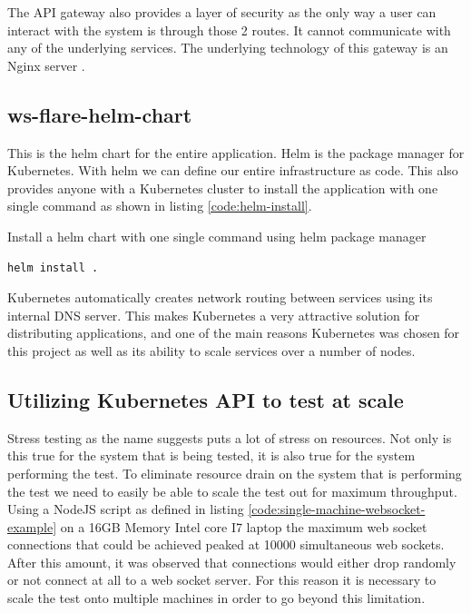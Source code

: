 The API gateway also provides a layer of security as the only way a user can interact with the system is through those 2 routes. It cannot communicate with any of the underlying services. The underlying technology of this gateway is an Nginx server \cite{nginx}.

\subsection{ws-flare-helm-chart}

This is the helm chart for the entire application. Helm is the package manager for Kubernetes. With helm we can define our entire infrastructure as code. This also provides anyone with a Kubernetes cluster to install the application with one single command as shown in listing \ref{code:helm-install}.

\begin{listing}[H]
    \caption{Install a helm chart with one single command using helm package manager}
    \label{code:helm-install}
    \begin{verbatim}
helm install .
\end{verbatim}
\end{listing}

Kubernetes automatically creates network routing between services using its internal DNS server. This makes Kubernetes a very attractive solution for distributing applications, and one of the main reasons Kubernetes was chosen for this project as well as its ability to scale services over a number of nodes.

\subsection{Utilizing Kubernetes API to test at scale}

Stress testing as the name suggests puts a lot of stress on resources. Not only is this true for the system that is being tested, it is also true for the system performing the test. To eliminate resource drain on the system that is performing the test we need to easily be able to scale the test out for maximum throughput. Using a NodeJS script as defined in listing \ref{code:single-machine-websocket-example} on a 16GB Memory Intel core I7 laptop the maximum web socket connections that could be achieved peaked at 10000 simultaneous web sockets. After this amount, it was observed that connections would either drop randomly or not connect at all to a web socket server. For this reason it is necessary to scale the test onto multiple machines in order to go beyond this limitation.

